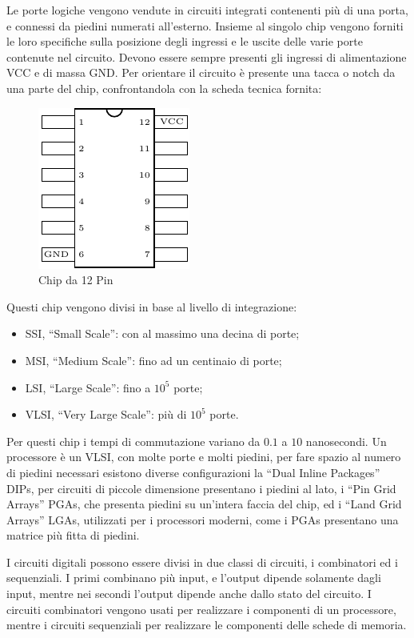 \documentclass{article}
\numberwithin{equation}{subsection}
\begin{document}
Le porte logiche vengono vendute in circuiti integrati contenenti più di una porta, e connessi da piedini numerati all'esterno. Insieme al singolo chip vengono forniti le loro specifiche sulla posizione degli ingressi 
e le uscite delle varie porte contenute nel circuito. Devono essere sempre presenti gli ingressi di alimentazione VCC e di massa GND. Per orientare il circuito è presente una tacca o notch da una parte del chip, 
confrontandola con la scheda tecnica fornita:
\begin{figure}[H]%
    \centering%
    \includegraphics{chip-integrato.pdf}%
    \caption{Chip da 12 Pin}%
\end{figure}
Questi chip vengono divisi in base al livello di integrazione:
\begin{itemize}
    \item SSI, ``Small Scale'': con al massimo una decina di porte;
    \item MSI, ``Medium Scale'': fino ad un centinaio di porte;
    \item LSI, ``Large Scale'': fino a $10^5$ porte;
    \item VLSI, ``Very Large Scale'': più di $10^5$ porte. 
\end{itemize}
Per questi chip i tempi di commutazione variano da $0.1$ a $10$ nanosecondi. 
Un processore è un VLSI, con molte porte e molti piedini, per fare spazio al numero di piedini necessari esistono diverse configurazioni la ``Dual Inline Packages'' DIPs, per circuiti di piccole dimensione 
presentano i piedini al lato, i ``Pin Grid Arrays'' PGAs, che presenta piedini su un'intera faccia del chip, ed i ``Land Grid Arrays'' LGAs, utilizzati per i processori moderni, come i PGAs presentano una matrice 
più fitta di piedini. 

I circuiti digitali possono essere divisi in due classi di circuiti, i combinatori ed i sequenziali. I primi combinano più input, e l'output dipende solamente dagli input, mentre nei secondi l'output dipende 
anche dallo stato del circuito. I circuiti combinatori vengono usati per realizzare i componenti di un processore, mentre i circuiti sequenziali per realizzare le componenti delle schede di memoria. 
\end{document}
